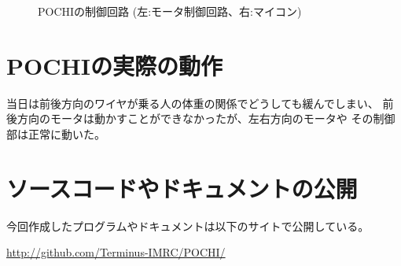 \begin{figure}[H]
\centering
\begin{minipage}{0.5\linewidth}
\caption{POCHIの制御回路 (左:モータ制御回路、右:マイコン)}
\label{fig:pochi-circuit}
\end{minipage}
\end{figure}

\section{POCHIの実際の動作}
当日は前後方向のワイヤが乗る人の体重の関係でどうしても緩んでしまい、
前後方向のモータは動かすことができなかったが、左右方向のモータや
その制御部は正常に動いた。

\section{ソースコードやドキュメントの公開}
今回作成したプログラムやドキュメントは以下のサイトで公開している。

\url{http://github.com/Terminus-IMRC/POCHI/}


